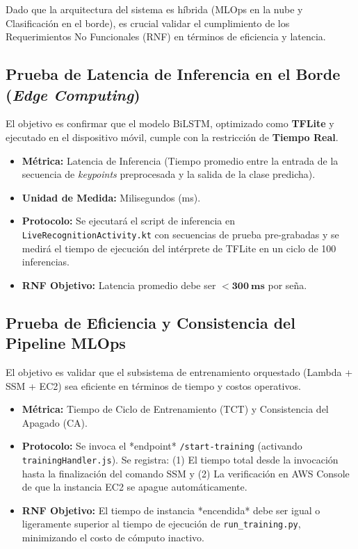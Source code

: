 Dado que la arquitectura del sistema es híbrida (MLOps en la nube y Clasificación en el borde), es crucial validar el cumplimiento de los Requerimientos No Funcionales (RNF) en términos de eficiencia y latencia.

\subsection{Prueba de Latencia de Inferencia en el Borde (\textit{Edge Computing})}

El objetivo es confirmar que el modelo BiLSTM, optimizado como \textbf{TFLite} y ejecutado en el dispositivo móvil, cumple con la restricción de \textbf{Tiempo Real}.

\begin{itemize}
    \item \textbf{Métrica:} Latencia de Inferencia (Tiempo promedio entre la entrada de la secuencia de \textit{keypoints} preprocesada y la salida de la clase predicha).
    \item \textbf{Unidad de Medida:} Milisegundos (ms).
    \item \textbf{Protocolo:} Se ejecutará el script de inferencia en \texttt{LiveRecognitionActivity.kt} con secuencias de prueba pre-grabadas y se medirá el tiempo de ejecución del intérprete de TFLite en un ciclo de 100 inferencias.
    \item \textbf{RNF Objetivo:} Latencia promedio debe ser $\mathbf{< 300\ ms}$ por seña.
\end{itemize}

\subsection{Prueba de Eficiencia y Consistencia del Pipeline MLOps}

El objetivo es validar que el subsistema de entrenamiento orquestado (Lambda + SSM + EC2) sea eficiente en términos de tiempo y costos operativos.

\begin{itemize}
    \item \textbf{Métrica:} Tiempo de Ciclo de Entrenamiento (TCT) y Consistencia del Apagado (CA).
    \item \textbf{Protocolo:} Se invoca el *endpoint* \texttt{/start-training} (activando \texttt{trainingHandler.js}). Se registra: (1) El tiempo total desde la invocación hasta la finalización del comando SSM y (2) La verificación en AWS Console de que la instancia EC2 se apague automáticamente.
    \item \textbf{RNF Objetivo:} El tiempo de instancia *encendida* debe ser igual o ligeramente superior al tiempo de ejecución de \texttt{run\_training.py}, minimizando el costo de cómputo inactivo.
\end{itemize}
\clearpage
